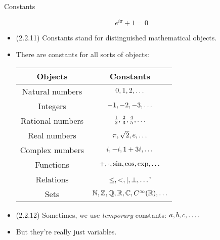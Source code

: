 \documentclass[../slides.tex]{subfiles}
\begin{document}
\begin{frame}{Constants}

\[e^{i\pi}+1=0\]
	
	\begin{itemize}
	
		\item (2.2.11) Constants stand for distinguished mathematical objects.
		
		\item There are constants for all sorts of objects:
		
			\begin{center}
				\begin{tabular}{c | c}
				Objects & Constants\\\hline
				Natural numbers & $0,1,2,\mathellipsis$\\
				Integers & $-1, -2, -3, \mathellipsis$\\
				Rational numbers & $\frac{1}{2}, \frac{2}{3}, \frac{4}{5},\mathellipsis$\\
				Real numbers & $\pi,\sqrt{2}, e,\mathellipsis$\\
				Complex numbers & $i, -i, 1+3i,\mathellipsis$\\
				Functions & $+, \cdot, \sin,\cos, \exp,\mathellipsis$\\
				Relations & $\leq, <, |, \bot,\mathellipsis$'\\
				Sets & $\mathbb{N}, \mathbb{Z}, \mathbb{Q}, \mathbb{R},\mathbb{C}, C^\infty(\mathbb{R}),\mathellipsis$ 
				\end{tabular}
			\end{center}
			
		\item (2.2.12) Sometimes, we use \emph{temporary} constants: $a,b,c,\mathellipsis.$
		
		\item But they're really just variables.
	
	\end{itemize}

\end{frame}
\end{document}

